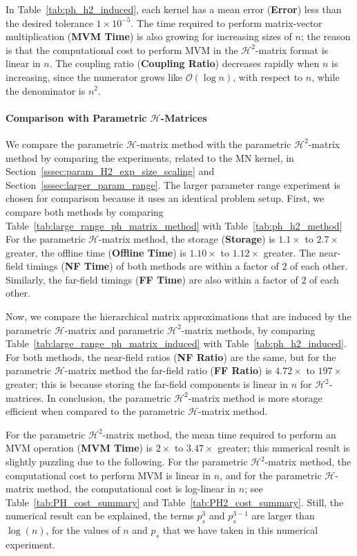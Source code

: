 \documentclass[final,3p,times]{elsarticle}
\newcommand{\mc}[1]{\mathcal{#1}}
\begin{document}
In Table~\ref{tab:ph_h2_induced}, each kernel has a mean error (\textbf{Error}) less than the desired tolerance $1 \times 10^{-5}$. The time required to perform matrix-vector multiplication (\textbf{MVM Time}) is also growing for increasing sizes of $n$; the reason is that the computational cost to perform MVM in the $\mc{H}^{2}$-matrix format is linear in $n$. The coupling ratio (\textbf{Coupling Ratio}) decreases rapidly when $n$ is increasing, since the numerator grows like $\mc{O}(\log n)$, with respect to $n$, while the denominator is $n^{2}$.


\paragraph{Comparison with Parametric $\mc{H}$-Matrices}
We compare the parametric $\mc{H}$-matrix method with the parametric $\mc{H}^{2}$-matrix method by comparing the experiments, related to the MN kernel, in Section~\ref{sssec:param_H2_exp_size_scaling} and Section~\ref{sssec:larger_param_range}. The larger parameter range experiment is chosen for comparison because it uses an identical problem setup. First, we compare both methods by comparing Table~\ref{tab:large_range_ph_matrix_method} with Table~\ref{tab:ph_h2_method} For the parametric $\mc{H}$-matrix method, the storage (\textbf{Storage}) is $1.1 \times$ to $2.7 \times$ greater, the offline time (\textbf{Offline Time}) is $1.10 \times$ to $1.12\times$ greater. The near-field timings (\textbf{NF Time}) of both methods are within a factor of $2$ of each other. Similarly, the far-field timings (\textbf{FF Time}) are also within a factor of $2$ of each other. 

Now, we compare the hierarchical matrix approximations that are induced by the parametric $\mc{H}$-matrix and parametric $\mc{H}^{2}$-matrix methods, by comparing Table~\ref{tab:large_range_ph_matrix_induced} with Table~\ref{tab:ph_h2_induced}. For both methods, the near-field ratios (\textbf{NF Ratio}) are the same, but for the parametric $\mc{H}$-matrix method the far-field ratio (\textbf{FF Ratio}) is $4.72 \times$ to $197 \times$ greater; this is because storing the far-field components is linear in $n$ for $\mc{H}^{2}$-matrices. In conclusion, the parametric $\mc{H}^{2}$-matrix method is more storage efficient when compared to the parametric $\mc{H}$-matrix method.


For the parametric $\mc{H}^{2}$-matrix method, the mean time required to perform an MVM operation (\textbf{MVM Time}) is $2 \times$ to $3.47 \times$ greater; this numerical result is slightly puzzling due to the following. For the parametric $\mc{H}^{2}$-matrix method, the computational cost to perform MVM is linear in $n$, and for the parametric $\mc{H}$-matrix method, the computational cost is log-linear in $n$; see  Table~\ref{tab:PH_cost_summary} and Table~\ref{tab:PH2_cost_summary}. Still, the numerical result can be explained, the terms $p_{s}^{3}$ and $p_{s}^{3-1}$ are  larger than $\log(n)$, for the values of $n$ and $p_s$ that we have taken in this numerical experiment. 
\end{document}
